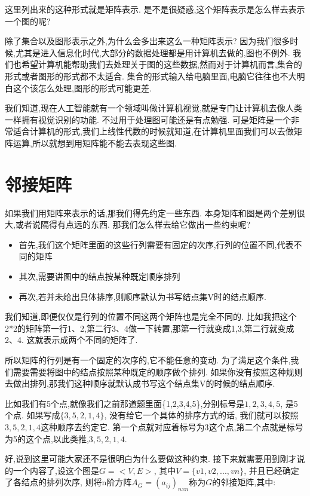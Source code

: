 这里列出来的这种形式就是矩阵表示. 是不是很疑惑,这个矩阵表示是怎么样去表示一个图的呢? 

除了集合以及图形表示之外,为什么会多出来这么一种矩阵表示? 因为我们很多时候,尤其是进入信息化时代,大部分的数据处理都是用计算机去做的,图也不例外. 我们也希望计算机能帮助我们去处理关于图的这些数据,然而对于计算机而言,集合的形式或者图形的形式都不太适合. 集合的形式输入给电脑里面,电脑它往往也不大明白这个该怎么处理,图形的形式可能更差. 

我们知道,现在人工智能就有一个领域叫做计算机视觉,就是专门让计算机去像人类一样拥有视觉识别的功能. 不过用于处理图可能还是有点勉强. 可是矩阵是一个非常适合计算机的形式,我们上线性代数的时候就知道,在计算机里面我们可以去做矩阵运算,所以就想到用矩阵能不能去表现这些图. 

\section{邻接矩阵}

如果我们用矩阵来表示的话,那我们得先约定一些东西. 本身矩阵和图是两个差别很大,或者说隔得有点远的东西. 那我们怎么样去给它做出一些约束呢? 

\begin{itemize}
  \item 首先,我们这个矩阵里面的这些行列需要有固定的次序,行列的位置不同,代表不同的矩阵
  \item 其次,需要讲图中的结点按某种既定顺序排列
  \item 再次,若并未给出具体排序,则顺序默认为书写结点集V时的结点顺序. 
\end{itemize}

我们知道,即便仅仅是行列的位置不同这两个矩阵也是完全不同的. 比如我把这个2*2的矩阵第一行1、2,第二行3、4做一下转置,那第一行就变成1,3,第二行就变成2、4. 这就表示成两个不同的矩阵了. 

所以矩阵的行列是有一个固定的次序的,它不能任意的变动. 为了满足这个条件,我们需要需要将图中的结点按照某种既定的顺序做个排列. 如果你没有按照这种规则去做出排列,那我们这种顺序就默认成书写这个结点集V的时候的结点顺序. 

比如我们有5个点,就像我们之前那道题里面\{1,2,3,4,5\},分别标号是$1,2,3,4,5$, 是5个点. 如果写成$\{3,5,2,1,4\}$, 没有给它一个具体的排序方式的话, 我们就可以按照$3,5,2,1,4$这种顺序去约定它. 第一个点就对应着标号为3这个点,第二个点就是标号为5的这个点,以此类推,$3,5,2,1,4$. 

好,说到这里可能大家还不是很明白为什么要做这种约束. 接下来就需要用到刚才说的一个内容了,设这个图是$G=<V,E>$, 其中$V=\{v1,v2,...,vn\}$, 并且已经确定了各结点的排列次序, 则将n阶方阵$A_G=(a_{ij})_{nxn}$称为$G$的邻接矩阵,其中: 

